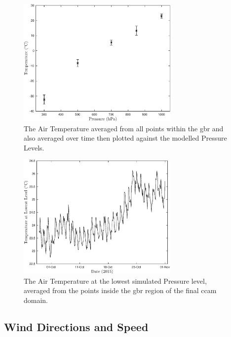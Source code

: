 \begin{figure}[!hbt]
    \centering
    \includegraphics[width=0.7\textwidth]{Fig/Research/CCAM/GBRnTimeAveragedPlot_temp.eps}
    \caption{ The Air Temperature averaged from all points within the \gls{gbr} and also averaged over time then plotted against the modelled Pressure Levels. }
    \label{fig:tempvpress}
\end{figure}
\clearpage

\begin{figure}[!t]
    \centering
    \includegraphics[width=0.7\textwidth]{Fig/Research/CCAM/GBRAveragedPlot_tbot.eps}
    \caption{ The Air Temperature at the lowest simulated Pressure level, averaged from the points inside the \gls{gbr} region of the final \gls{ccam} domain. }
    \label{fig:tbottime}
\end{figure}


\subsection{Wind Directions and Speed}
\label{subsec:windresults}


